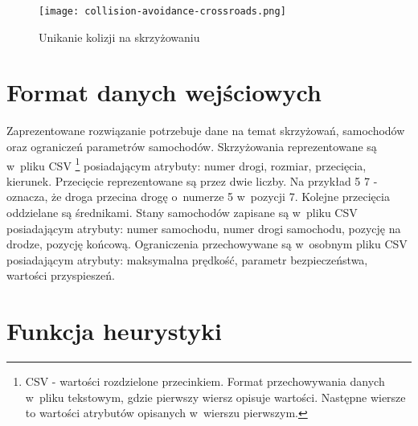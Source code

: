 \begin{figure}[H]
    \texttt{[image: collision-avoidance-crossroads.png]}
  \caption{Unikanie kolizji na skrzyżowaniu}
  \label{collision-avoidance-crossroads}
\end{figure}
\newpage

\section{Format danych wejściowych}

Zaprezentowane rozwiązanie potrzebuje dane na temat skrzyżowań, samochodów oraz ograniczeń parametrów samochodów. Skrzyżowania reprezentowane są w~pliku CSV \footnote{CSV - wartości rozdzielone przecinkiem. Format przechowywania danych w~pliku tekstowym, gdzie pierwszy wiersz opisuje wartości. Następne wiersze to wartości atrybutów opisanych w~wierszu pierwszym. } posiadającym atrybuty: numer drogi, rozmiar, przecięcia, kierunek. Przecięcie reprezentowane są przez dwie liczby. Na przykład 5 7 - oznacza, że droga przecina drogę o~numerze 5 w~pozycji 7. Kolejne przecięcia oddzielane są średnikami. Stany samochodów zapisane są w~pliku CSV posiadającym atrybuty: numer samochodu, numer drogi samochodu, pozycję na drodze, pozycję końcową. Ograniczenia przechowywane są w~osobnym pliku CSV posiadającym atrybuty: maksymalna prędkość, parametr bezpieczeństwa, wartości przyspieszeń.

\section{Funkcja heurystyki}

